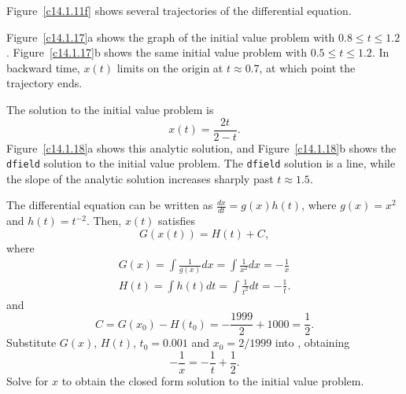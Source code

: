 \newpage
{} Figure~\ref{c14.1.11f} shows several trajectories of the
differential equation.

\begin{figure}[htb]
                       \centerline{%
                       }
\end{figure}

 Figure~\ref{c14.1.17}a shows the graph of the initial
value problem with $0.8 \leq t \leq 1.2$.  Figure~\ref{c14.1.17}b shows
the same initial value problem with $0.5 \leq t \leq 1.2$.  In
backward time, $x(t)$ limits on the origin at $t \approx 0.7$, at
which point the trajectory ends.

\begin{figure}[htb]
                       \centerline{%
                       }
\end{figure}

 \ans The solution to the initial value problem is
\[
x(t) = \frac{2t}{2 - t}.
\]
Figure~\ref{c14.1.18}a shows this analytic solution, and
Figure~\ref{c14.1.18}b shows the {\tt dfield} solution to the initial
value problem.  The {\tt dfield} solution is a line, while the slope
of the analytic solution increases sharply past $t \approx 1.5$.

\soln The differential equation can be written as $\frac{dx}{dt} = g(x)h(t)$,
where $g(x) = x^2$ and $h(t) = t^{-2}$.  Then, $x(t)$ satisfies
\begin{equation} \label{eq:14.1.18}
G(x(t)) = H(t) + C,
\end{equation}
where
\[
\begin{array}{l}
G(x) = \int\frac{1}{g(x)}dx = \int\frac{1}{x^2}dx = -\frac{1}{x} \\
H(t) = \int h(t)dt = \int\frac{1}{t^2}dt = -\frac{1}{t}.
\end{array}
\]
and
\[
C = G(x_0) - H(t_0) = -\frac{1999}{2} + 1000  = \frac{1}{2}.
\]
Substitute $G(x)$, $H(t)$, $t_0 = 0.001$ and $x_0 = 2/1999$ into
, obtaining
\[
-\frac{1}{x} = -\frac{1}{t} + \frac{1}{2}.
\]
Solve for $x$ to obtain the closed form solution to the initial value problem.

\begin{figure}[htb]
                       \centerline{%
                       }
\end{figure}



